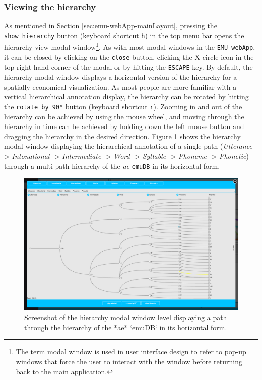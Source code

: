 \documentclass[]{book}
\let\rmarkdownfootnote\footnote%
\def\footnote{\protect\rmarkdownfootnote}
\begin{document}
\hypertarget{viewing-the-hierarchy}{%
\subsubsection{Viewing the hierarchy}\label{viewing-the-hierarchy}}

As mentioned in Section \ref{sec:emu-webApp-mainLayout}, pressing the \texttt{show\ hierarchy} button (keyboard shortcut \texttt{h}) in the top menu bar opens the hierarchy view modal window\footnote{The term modal window is used in user interface design to refer to pop-up windows that force the user to interact with the window before returning back to the main application.}. As with most modal windows in the \texttt{EMU-webApp}, it can be closed by clicking on the \texttt{close} button, clicking the X circle icon in the top right hand corner of the modal or by hitting the \texttt{ESCAPE} key. By default, the hierarchy modal window displays a horizontal version of the hierarchy for a spatially economical visualization. As most people are more familiar with a vertical hierarchical annotation display, the hierarchy can be rotated by hitting the \texttt{rotate\ by\ 90°} button (keyboard shortcut \texttt{r}). Zooming in and out of the hierarchy can be achieved by using the mouse wheel, and moving through the hierarchy in time can be achieved by holding down the left mouse button and dragging the hierarchy in the desired direction. Figure \ref{fig:webApp-hierModal} shows the hierarchy modal window displaying the hierarchical annotation of a single path (\emph{Utterance} -\textgreater{} \emph{Intonational} -\textgreater{} \emph{Intermediate} -\textgreater{} \emph{Word} -\textgreater{} \emph{Syllable} -\textgreater{} \emph{Phoneme} -\textgreater{} \emph{Phonetic}) through a multi-path hierarchy of the \emph{ae} \texttt{emuDB} in its horizontal form.

\begin{figure}

{\centering \includegraphics[width=0.75\linewidth]{pics/emu-webAppHierModal} 

}

\caption{Screenshot of the hierarchy modal window level displaying a path through the hierarchy of the *ae* `emuDB` in its horizontal form.}\label{fig:webApp-hierModal}
\end{figure}
\end{document}
